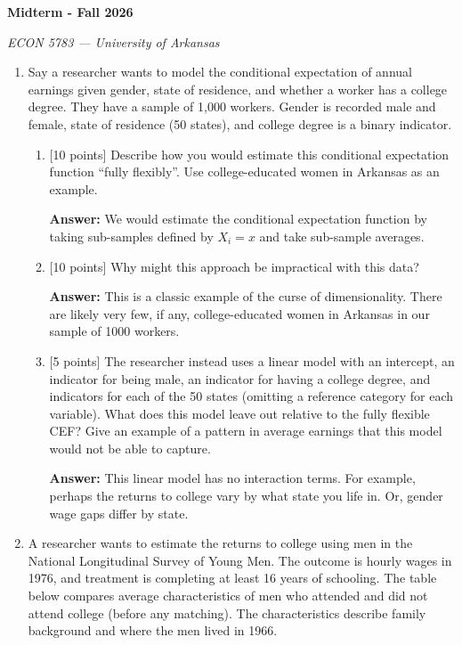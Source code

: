 \documentclass[12pt]{article}
\newcommand{\answer}[1]{{\color{blue_winged_teal}\textbf{Answer:} #1}}
\newcommand{\pts}[1]{{\color{zinc500}[#1 points]}}
\begin{document}
\begin{center}
  {\Huge\bf Midterm - Fall 2026}

  \smallskip
  {\large\it ECON 5783 — University of Arkansas}
\end{center}

\medskip
\begin{enumerate}
  \item Say a researcher wants to model the conditional expectation of annual earnings given gender, state of residence, and whether a worker has a college degree.
  They have a sample of 1,000 workers.
  Gender is recorded male and female, state of residence (50 states), and college degree is a binary indicator.
  \begin{enumerate}[label=(\alph*)]
    \item \pts{10} Describe how you would estimate this conditional expectation function ``fully flexibly''. 
    Use college-educated women in Arkansas as an example.

    \answer{
      We would estimate the conditional expectation function by taking sub-samples defined by $X_i = x$ and take sub-sample averages.
    }

    \item \pts{10} Why might this approach be impractical with this data?
    
    \answer{
      This is a classic example of the curse of dimensionality. 
      There are likely very few, if any, college-educated women in Arkansas in our sample of 1000 workers.
    }

    \item \pts{5} The researcher instead uses a linear model with an intercept, an indicator for being male, an indicator for having a college degree, and indicators for each of the 50 states (omitting a reference category for each variable).
    What does this model leave out relative to the fully flexible CEF?
    Give an example of a pattern in average earnings that this model would not be able to capture.

    \answer{
      This linear model has no interaction terms. 
      For example, perhaps the returns to college vary by what state you life in.
      Or, gender wage gaps differ by state. 
    }
  \end{enumerate}

  \newpage
  \item A researcher wants to estimate the returns to college using men in the National Longitudinal Survey of Young Men.
  The outcome is hourly wages in 1976, and treatment is completing at least 16 years of schooling.
  The table below compares average characteristics of men who attended and did not attend college (before any matching).
  The characteristics describe family background and where the men lived in 1966.


\end{enumerate}
\end{document}
